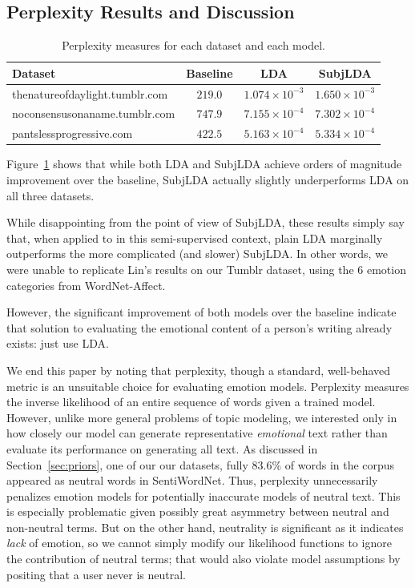 \documentclass{article}
\begin{document}
\subsection{Perplexity Results and Discussion}
\begin{table}
\centering
\begin{tabular}{l c c c}
\bf Dataset & \bf Baseline & \bf LDA & \bf SubjLDA \\
\hline
thenatureofdaylight.tumblr.com & $219.0$ & $1.074 \times 10^{-3}$ & $1.650 \times 10^{-3}$ \\
noconsensusonaname.tumblr.com  & $747.9$ & $7.155 \times 10^{-4}$ & $7.302 \times 10^{-4}$ \\
pantslessprogressive.com       & $422.5$ & $5.163 \times 10^{-4}$ & $5.334 \times 10^{-4}$ \\
\end{tabular}
\caption{Perplexity measures for each dataset and each model.\label{tab:perp}}
\end{table}
Figure~\ref{tab:perp} shows that while both LDA and SubjLDA achieve
orders of magnitude improvement over the baseline, SubjLDA actually
slightly underperforms LDA on all three datasets.

While disappointing from the point of view of SubjLDA, these results
simply say that, when applied to in this semi-supervised context,
plain LDA marginally outperforms the more complicated (and slower)
SubjLDA. In other words, we were unable to replicate Lin's results
on our Tumblr dataset, using the 6 emotion categories from
WordNet-Affect.

However, the significant improvement of both models over the baseline
indicate that solution to evaluating the emotional content of
a person's writing already exists: just use LDA.

We end this paper by noting that perplexity, though a standard,
well-behaved metric is an unsuitable choice for evaluating emotion
models. Perplexity measures the inverse likelihood of an entire
sequence of words given a trained model. However, unlike more general
problems of topic modeling, we interested only in how closely our
model can generate representative \emph{emotional} text rather than
evaluate its performance on generating all text.  As discussed in
Section~\ref{sec:priors}, one of our our datasets, fully 83.6\% of
words in the corpus appeared as neutral words in SentiWordNet.
Thus, perplexity unnecessarily penalizes emotion models for
potentially inaccurate models of neutral text. This is especially
problematic given possibly great asymmetry between neutral and
non-neutral terms. But on the other hand, neutrality is significant
as it indicates \emph{lack} of emotion, so we cannot simply modify
our likelihood functions to ignore the contribution of neutral terms;
that would also violate model assumptions by positing that a user
never is neutral.
\end{document}
